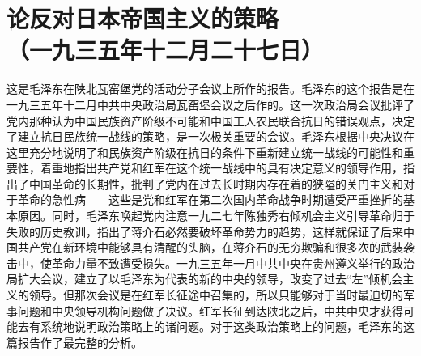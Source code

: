 \documentclass[cn,11pt,chinese]{elegantbook}
\def\myformat#1{\hfil\hfil #1}
\begin{document}
\newpage\section*{\myformat{论反对日本帝国主义的策略}\\\myformat{（一九三五年十二月二十七日）}}
\begin{introduction}\item  这是毛泽东在陕北瓦窑堡党的活动分子会议上所作的报告。毛泽东的这个报告是在一九三五年十二月中共中央政治局瓦窑堡会议之后作的。这一次政治局会议批评了党内那种认为中国民族资产阶级不可能和中国工人农民联合抗日的错误观点，决定了建立抗日民族统一战线的策略，是一次极关重要的会议。毛泽东根据中央决议在这里充分地说明了和民族资产阶级在抗日的条件下重新建立统一战线的可能性和重要性，着重地指出共产党和红军在这个统一战线中的具有决定意义的领导作用，指出了中国革命的长期性，批判了党内在过去长时期内存在着的狭隘的关门主义和对于革命的急性病——这些是党和红军在第二次国内革命战争时期遭受严重挫折的基本原因。同时，毛泽东唤起党内注意一九二七年陈独秀右倾机会主义引导革命归于失败的历史教训，指出了蒋介石必然要破坏革命势力的趋势，这样就保证了后来中国共产党在新环境中能够具有清醒的头脑，在蒋介石的无穷欺骗和很多次的武装袭击中，使革命力量不致遭受损失。一九三五年一月中共中央在贵州遵义举行的政治局扩大会议，建立了以毛泽东为代表的新的中央的领导，改变了过去“左”倾机会主义的领导。但那次会议是在红军长征途中召集的，所以只能够对于当时最迫切的军事问题和中央领导机构问题做了决议。红军长征到达陕北之后，中共中央才获得可能去有系统地说明政治策略上的诸问题。对于这类政治策略上的问题，毛泽东的这篇报告作了最完整的分析。\end{introduction}
\end{document}
